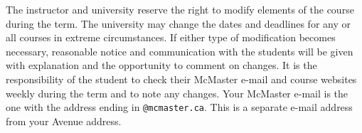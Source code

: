 \documentclass[12pt]{article}
\begin{document}
The instructor and university reserve the right to modify elements of
the course during the term.  The university may change the dates and
deadlines for any or all courses in extreme circumstances.  If either
type of modification becomes necessary, reasonable notice and
communication with the students will be given with explanation and the
opportunity to comment on changes. It is the responsibility of the
student to check their McMaster e-mail and course websites weekly
during the term and to note any changes.  Your McMaster e-mail is the
one with the address ending in \texttt{@mcmaster.ca}.  This is a
separate e-mail address from your Avenue address.
\end{document}
